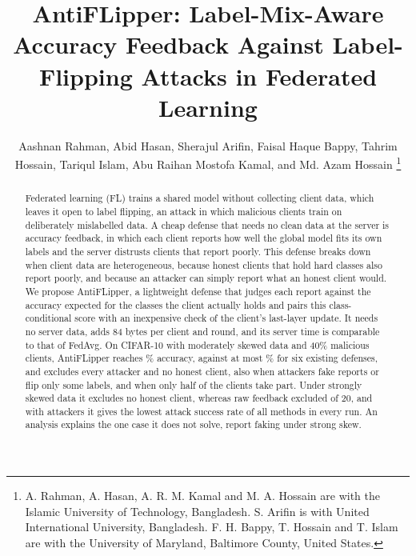 \documentclass[journal]{IEEEtran}
\begin{document}
\title{AntiFLipper: Label-Mix-Aware Accuracy Feedback Against Label-Flipping Attacks in Federated Learning}

\author{Aashnan Rahman, Abid Hasan, Sherajul Arifin, Faisal Haque Bappy, Tahrim Hossain, Tariqul Islam, Abu Raihan Mostofa Kamal, and Md. Azam Hossain
\thanks{A. Rahman, A. Hasan, A. R. M. Kamal and M. A. Hossain are with the Islamic University of Technology, Bangladesh. S. Arifin is with United International University, Bangladesh. F. H. Bappy, T. Hossain and T. Islam are with the University of Maryland, Baltimore County, United States.}}


\maketitle

\begin{abstract}
Federated learning (FL) trains a shared model without collecting client data, which leaves it open to label flipping, an attack in which malicious clients train on deliberately mislabelled data. A cheap defense that needs no clean data at the server is accuracy feedback, in which each client reports how well the global model fits its own labels and the server distrusts clients that report poorly. This defense breaks down when client data are heterogeneous, because honest clients that hold hard classes also report poorly, and because an attacker can simply report what an honest client would. We propose AntiFLipper, a lightweight defense that judges each report against the accuracy expected for the classes the client actually holds and pairs this class-conditional score with an inexpensive check of the client's last-layer update. It needs no server data, adds 84 bytes per client and round, and its server time is comparable to that of FedAvg. On CIFAR-10 with moderately skewed data and 40\% malicious clients, AntiFLipper reaches \headAcc\% accuracy, against at most \headAccFLTrust\% for six existing defenses, and excludes every attacker and no honest client, also when attackers fake reports or flip only some labels, and when only half of the clients take part. Under strongly skewed data it excludes no honest client, whereas raw feedback excluded \cleanHonRaw{} of 20, and with attackers it gives the lowest attack success rate of all methods in every run. An analysis explains the one case it does not solve, report faking under strong skew.
\end{abstract}
\end{document}
